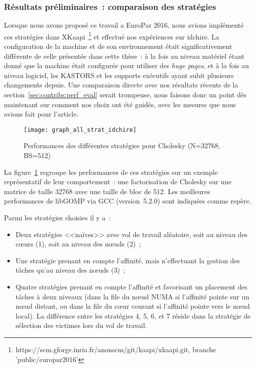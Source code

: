 \subsubsection{Résultats préliminaires~: comparaison des stratégies}
\label{sec:openmp:runtime:preliminary_results}

Lorsque nous avons proposé ce travail a EuroPar 2016, nous avions implémenté ces stratégies dans XKaapi~\footnote{https://scm.gforge.inria.fr/anonscm/git/kaapi/xkaapi.git, branche 'public/europar2016'} et effectué nos expériences sur idchire.
La configuration de la machine et de son environnement était significativement différente de celle présentée dans cette thèse~: à la fois au niveau matériel étant donné que la machine était configurée pour utiliser des \emph{huge pages}, et à la fois au niveau logiciel, les KASTORS et les supports exécutifs ayant subit plusieurs changements depuis.
Une comparaison directe avec nos résultats récents de la section~\ref{sec:contribs:perf_eval} serait trompeuse, nous faisons donc un point dès maintenant sur comment nos choix ont été guidés, avec les mesures que nous avions fait pour l'article.

\begin{figure}[ht]
  \centering
  \texttt{[image: graph\_all\_strat\_idchire]}
  \caption{Performances des différentes stratégies pour Cholesky (N=32768, BS=512)}\label{fig:contribs:perf_eval:eval-strategies}
\end{figure}

La figure~\ref{fig:contribs:perf_eval:eval-strategies} regroupe les performances de ces stratégies sur un exemple représentatif de leur comportement~: une factorisation de Cholesky sur une matrice de taille 32768 avec une taille de bloc de 512.
Les meilleures performances de libGOMP via GCC (version~5.2.0) sont indiquées comme repère.

Parmi les stratégies choisies il y a~:
\begin{itemize}
  \item Deux stratégies <<naïves>> avec vol de travail aléatoire, soit au niveau des cœurs (1), soit au niveau des nœuds (2)~;
  \item Une stratégie prenant en compte l'affinité, mais n'effectuant la gestion des tâches qu'au niveau des nœuds (3)~;
  \item Quatre stratégies prenant en compte l'affinité et favorisant un placement des tâches à deux niveaux (dans la file du nœud NUMA si l'affinité pointe sur un nœud distant, ou dans la file du cœur courant si l'affinité pointe vers le nœud local). La différence entre les stratégies 4, 5, 6, et 7 réside dans la stratégie de sélection des victimes lors du vol de travail.
\end{itemize}

